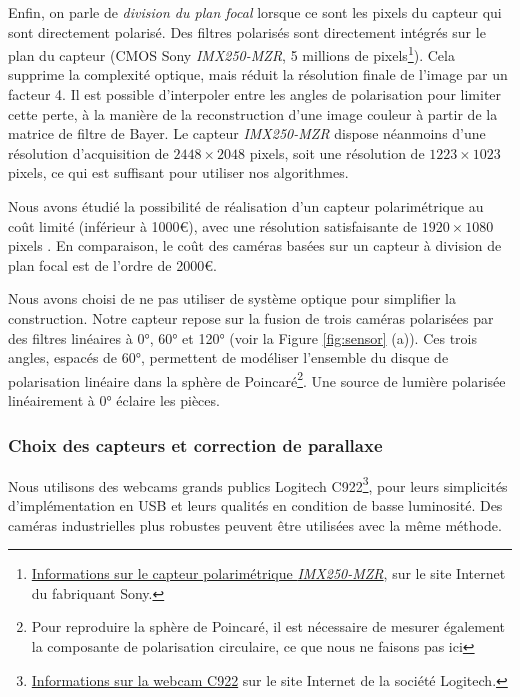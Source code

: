 Enfin, on parle de \textit{division du plan focal} lorsque ce sont les pixels du capteur qui sont directement polarisé.
Des filtres polarisés sont directement intégrés sur le plan du capteur \cite{yamazaki_fourdirectional_2016} (CMOS Sony \textit{IMX250-MZR}, 5 millions de pixels\footnote{\href{https://www.sony-semicon.co.jp/products_en/IS/sensor5/index.html}{Informations sur le capteur polarimétrique \textit{IMX250-MZR}}, sur le site Internet du fabriquant Sony.}).
Cela supprime la complexité optique, mais réduit la résolution finale de l'image par un facteur 4.
Il est possible d'interpoler entre les angles de polarisation pour limiter cette perte, à la manière de la reconstruction d'une image couleur à partir de la matrice de filtre de Bayer.
Le capteur \textit{IMX250-MZR} dispose néanmoins d'une résolution d'acquisition de $2448\times 2048$ pixels, soit une résolution  de $1223\times 1023$ pixels, ce qui est suffisant pour utiliser nos algorithmes.

Nous avons étudié la possibilité de réalisation d'un capteur polarimétrique au coût limité (inférieur à 1000€), avec une résolution satisfaisante de $1920\times 1080$ pixels \cite{nagorny_polarimetric_2019}.
En comparaison, le coût des caméras basées sur un capteur à division de plan focal est de l'ordre de 2000€.

Nous avons choisi de ne pas utiliser de système optique pour simplifier la construction.
Notre capteur repose sur la fusion de trois caméras polarisées par des filtres linéaires à 0°, 60° et 120° (voir la Figure \ref{fig:sensor} (a)).
Ces trois angles, espacés de 60°, permettent de modéliser l'ensemble du disque de polarisation linéaire dans la sphère de Poincaré\footnote{Pour reproduire la sphère de Poincaré, il est nécessaire de mesurer également la composante de polarisation circulaire, ce que nous ne faisons pas ici}.
Une source de lumière polarisée linéairement à 0° éclaire les pièces.


\subsubsection{Choix des capteurs et correction de parallaxe}
Nous utilisons des webcams grands publics Logitech C922\footnote{\href{https://www.logitech.fr/fr-fr/product/c922-pro-stream-webcam}{Informations sur la webcam C922} sur le site Internet de la société Logitech.}, pour leurs simplicités d'implémentation en USB et leurs qualités en condition de basse luminosité.
Des caméras industrielles plus robustes peuvent être utilisées avec la même méthode.

